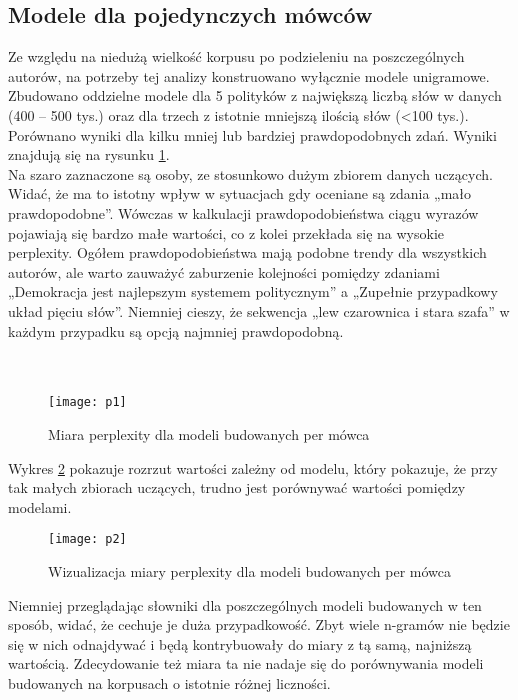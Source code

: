 \documentclass[a4paper,11pt,twoside]{report}
\theoremstyle{definition}
\begin{document}
\subsection{Modele dla pojedynczych mówców}
Ze względu na niedużą wielkość korpusu po podzieleniu na poszczególnych autorów, na potrzeby tej analizy konstruowano wyłącznie modele unigramowe. Zbudowano oddzielne modele dla 5 polityków z największą liczbą słów w danych (400 – 500 tys.) oraz dla trzech z istotnie mniejszą ilością słów (<100 tys.). Porównano wyniki dla kilku mniej lub bardziej prawdopodobnych zdań. Wyniki znajdują się na rysunku \ref{pic:51}. \\

Na szaro zaznaczone są osoby, ze stosunkowo dużym zbiorem danych uczących. Widać, że ma to istotny wpływ w sytuacjach gdy oceniane są zdania „mało prawdopodobne”. Wówczas w kalkulacji prawdopodobieństwa ciągu wyrazów pojawiają się bardzo małe wartości, co z kolei przekłada się na wysokie perplexity. Ogółem prawdopodobieństwa mają podobne trendy dla wszystkich autorów, ale warto zauważyć zaburzenie kolejności pomiędzy zdaniami „Demokracja jest najlepszym systemem politycznym” a „Zupełnie przypadkowy układ pięciu słów”. Niemniej cieszy, że sekwencja „lew czarownica i stara szafa” w każdym przypadku są opcją najmniej prawdopodobną.\\\\\\

\begin{figure}[h] 
\texttt{[image: p1]} 
\centering
\caption{Miara perplexity dla modeli budowanych per mówca} \label{pic:51}
\end{figure} 
Wykres \ref{pic:52} pokazuje rozrzut wartości zależny od modelu, który pokazuje, że przy tak małych zbiorach uczących, trudno jest porównywać wartości pomiędzy modelami.\\

\begin{figure}[h] 
\texttt{[image: p2]} 
\centering
\caption{Wizualizacja miary perplexity dla modeli budowanych per mówca} \label{pic:52}
\end{figure}
Niemniej przeglądając słowniki dla poszczególnych modeli budowanych w ten sposób, widać, że cechuje je duża przypadkowość. Zbyt wiele n-gramów nie będzie się w nich odnajdywać i będą kontrybuowały do miary z tą samą, najniższą wartością. Zdecydowanie też miara ta nie nadaje się do porównywania  modeli budowanych na korpusach o istotnie różnej liczności.
\end{document}
